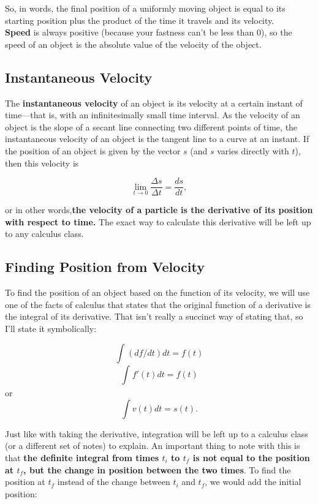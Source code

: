 \documentclass[12pt,letterpaper]{article}
\begin{document}
So, in words, the final position of a uniformly moving object is equal to its starting position plus the product of the time it travels and its velocity. \\

\textbf{Speed} is always positive (because your fastness can't be less than 0), so the speed of an object is the absolute value of the velocity of the object.

\subsection[Instantaneous Velocity]{Instantaneous Velocity}

The \textbf{instantaneous velocity} of an object is its velocity at a certain instant of time---that is, with an infinitesimally small time interval. As the velocity of an object is the slope of a secant line connecting two different points of time, the instantaneous velocity of an object is the tangent line to a curve at an instant. If the position of an object is given by the vector $s$ (and $s$ varies directly with $t$), then this velocity is

\begin{center}
$$\lim_{t\to0}\frac{\Delta s}{\Delta t} = \frac{ds}{dt},$$\linebreak
\end{center}

or in other words,\textbf{the velocity of a particle is the derivative of its position with respect to time.} The exact way to calculate this derivative will be left up to any calculus class.

\subsection[Finding Position from Velocity]{Finding Position from Velocity}

To find the position of an object based on the function of its velocity, we will use one of the facts of calculus that states that the original function of a derivative is the integral of its derivative. That isn't really a succinct way of stating that, so I'll state it symbolically:

\begin{center}
$$\int_{}^{}(df/dt)dt  = f(t)$$$$\int_{}^{}f'(t)dt = f(t)$$ or $$\int v(t)dt = s(t).$$\linebreak
\end{center}

Just like with taking the derivative, integration will be left up to a calculus class (or a different set of notes) to explain. An important thing to note with this is that \textbf{the definite integral from times $t_{i}$ to $t_{f}$ is not equal to the position at $t_{f}$, but the change in position between the two times}. To find the position at $t_{f}$ instead of the change between $t_{i}$ and $t_{f}$, we would add the initial position:
\end{document}
